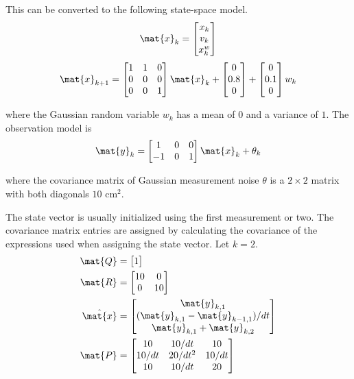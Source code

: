 This can be converted to the following state-space \gls{model}.
\begin{equation}
  \mat{x}_k =
  \begin{bmatrix}
    x_k \\
    v_k \\
    x_k^w
  \end{bmatrix}
\end{equation}
\begin{equation}
  \mat{x}_{k+1} =
  \begin{bmatrix}
    1 & 1 & 0 \\
    0 & 0 & 0 \\
    0 & 0 & 1
  \end{bmatrix} \mat{x}_k +
  \begin{bmatrix}
    0 \\
    0.8 \\
    0
  \end{bmatrix} +
  \begin{bmatrix}
    0 \\
    0.1 \\
    0
  \end{bmatrix} w_k
\end{equation}

where the Gaussian random variable $w_k$ has a mean of $0$ and a variance of
$1$. The observation \gls{model} is
\begin{equation}
  \mat{y}_k =
  \begin{bmatrix}
    1 & 0 & 0 \\
    -1 & 0 & 1
  \end{bmatrix} \mat{x}_k + \theta_k
\end{equation}

where the covariance matrix of Gaussian measurement noise $\theta$ is a
$2 \times 2$ matrix with both diagonals $10$ cm$^2$.

The \gls{state} vector is usually initialized using the first measurement or
two. The covariance matrix entries are assigned by calculating the covariance of
the expressions used when assigning the state vector. Let $k = 2$.
\begin{align}
  \mat{Q} &= \begin{bmatrix}1\end{bmatrix} \\
  \mat{R} &=
  \begin{bmatrix}
    10 & 0 \\
    0 & 10
  \end{bmatrix} \\
  \hat{\mat{x}} &=
  \begin{bmatrix}
    \mat{y}_{k,1} \\
    (\mat{y}_{k,1} - \mat{y}_{k-1,1})/dt \\
    \mat{y}_{k,1} + \mat{y}_{k,2}
  \end{bmatrix} \\
  \mat{P} &=
  \begin{bmatrix}
    10 & 10/dt & 10 \\
    10/dt & 20/dt^2 & 10/dt \\
    10 & 10/dt & 20
  \end{bmatrix}
\end{align}

